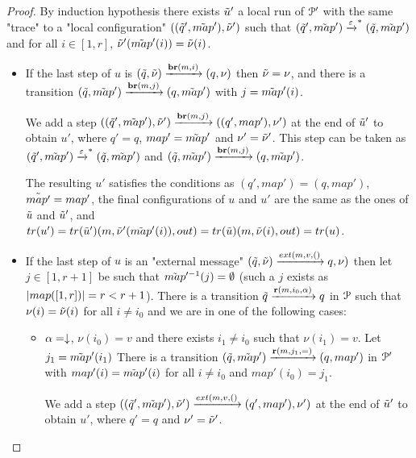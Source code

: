 \begin{proof}
	By induction hypothesis there exists $\Tilde{u}'$ a local run of $\mathcal{P}'$ with the same "trace" to a "local configuration" $((\Tilde{q}', \Tilde{map}'), \Tilde{\nu}')$ such that $(\Tilde{q}', \Tilde{map}') \xrightarrow{\varepsilon}^* (\Tilde{q}, \Tilde{map}')$ and for all $i \in [1,r]$, $\Tilde{\nu}'(\Tilde{map}'(i)) = \Tilde{\nu}(i)$.
	
	\begin{itemize}
		\item 
		If the last step of $u$ is $(\Tilde{q}, \Tilde{\nu}) \xrightarrow{\textbf{br}(m, i)} (q, \nu)$ then $\Tilde{\nu} = \nu$, and there is a transition $(\Tilde{q}, \Tilde{map}') \xrightarrow{\textbf{br}(m, j)} (q, \Tilde{map}')$ with $j=\Tilde{map}'(i)$.
		
		We add a step $((\Tilde{q}', \Tilde{map}'), \Tilde{\nu}') \xrightarrow{\textbf{br}(m, j)} ((q', map'), \nu')$ at the end of $\Tilde{u}'$ to obtain $u'$, where $q' = q$, $map' = \Tilde{map}'$ and $\nu' = \Tilde{\nu}'$. 
		This step can be taken as $(\Tilde{q}', \Tilde{map}') \xrightarrow{\varepsilon}^* (\Tilde{q}, \Tilde{map}')$ and $(\Tilde{q}, \Tilde{map}') \xrightarrow{\textbf{br}(m, j)} (q, \Tilde{map}')$.   
		
		The resulting $u'$ satisfies the conditions as $(q', map') = (q, map')$, $\Tilde{map'} = map'$, the final configurations of $u$ and $u'$ are the same as the ones of $\Tilde{u}$ and $\Tilde{u}'$, and $\trace{u'} = \trace{\Tilde{u}'} (m,\Tilde{\nu}'(\Tilde{map}'(i)),out) = \trace{\Tilde{u}} (m,\Tilde{\nu}(i),out) = \trace{u}$.
		
		\item 
		If the last step of $u$ is an "external message" $(\Tilde{q}, \Tilde{\nu}) \extbr{m, v} (q, \nu)$ then let $j\in [1,r+1]$ be such that $\Tilde{map}'^{-1}(j) = \emptyset$ (such a $j$ exists as $|map([1,r])| = r < r+1$). There is a transition $\Tilde{q} \xrightarrow{\textbf{r}(m, i_0, \alpha)} q$ in $\mathcal{P}$ such that $\nu(i)=\Tilde{\nu}(i)$ for all $i\neq i_0$ and we are in one of the following cases:
		
		\begin{itemize}
			\item $\alpha=\downarrow$, $\nu(i_0) = v$ and there exists $i_1 \neq i_0$ such that $\nu(i_1) = v$. Let $j_1=\Tilde{map}'(i_1)$
			There is a transition $(\Tilde{q}, \Tilde{map}') \xrightarrow{\textbf{r}(m, j_1, {=})} (q, map')$ in $\mathcal{P}'$ with $map'(i) = \Tilde{map}'(i)$ for all $i\neq i_0$ and $map'(i_0) = j_1$.
			
			We add a step $((\Tilde{q}', \Tilde{map}'), \Tilde{\nu}') \extbr{m, v} ((q', map'), \nu')$ at the end of $\Tilde{u}'$ to obtain $u'$, where $q' = q$ and $\nu' = \Tilde{\nu}'$.
			

\end{itemize}
\end{itemize}
\end{proof}
